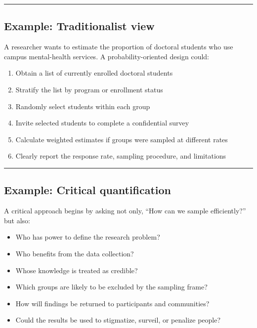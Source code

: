 \documentclass[
  letterpaper,
  DIV=11,
  numbers=noendperiod]{scrartcl}
\providecommand{\tightlist}{%
  \setlength{\itemsep}{0pt}\setlength{\parskip}{0pt}}\usepackage{longtable,booktabs,array}
\begin{document}
\begin{center}\rule{0.5\linewidth}{0.5pt}\end{center}

\subsection{Example: Traditionalist
view}\label{example-traditionalist-view-1}

A researcher wants to estimate the proportion of doctoral students who
use campus mental-health services. A probability-oriented design could:

\begin{enumerate}
\def\labelenumi{\arabic{enumi}.}
\tightlist
\item
  Obtain a list of currently enrolled doctoral students
\item
  Stratify the list by program or enrollment status
\item
  Randomly select students within each group
\item
  Invite selected students to complete a confidential survey
\item
  Calculate weighted estimates if groups were sampled at different rates
\item
  Clearly report the response rate, sampling procedure, and limitations
\end{enumerate}

\begin{center}\rule{0.5\linewidth}{0.5pt}\end{center}

\subsection{Example: Critical
quantification}\label{example-critical-quantification}

A critical approach begins by asking not only, ``How can we sample
efficiently?'' but also:

\begin{itemize}
\tightlist
\item
  Who has power to define the research problem?
\item
  Who benefits from the data collection?
\item
  Whose knowledge is treated as credible?
\item
  Which groups are likely to be excluded by the sampling frame?
\item
  How will findings be returned to participants and communities?
\item
  Could the results be used to stigmatize, surveil, or penalize people?
\end{itemize}
\end{document}
